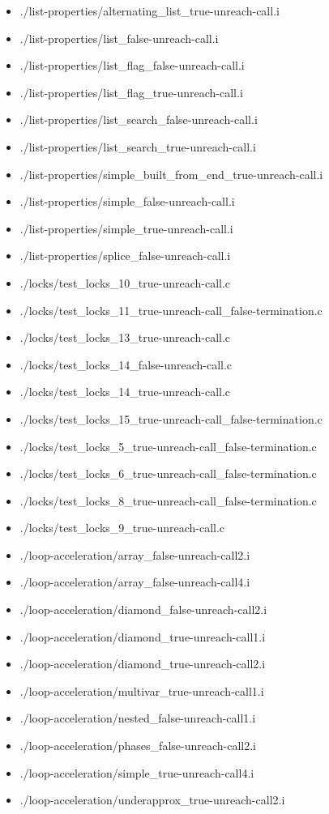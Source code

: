 \documentclass[envcountsame]{llncs}
\begin{document}
\begin{itemize}
\item ./list-properties/alternating\_list\_true-unreach-call.i
\item ./list-properties/list\_false-unreach-call.i
\item ./list-properties/list\_flag\_false-unreach-call.i
\item ./list-properties/list\_flag\_true-unreach-call.i
\item ./list-properties/list\_search\_false-unreach-call.i
\item ./list-properties/list\_search\_true-unreach-call.i
\item ./list-properties/simple\_built\_from\_end\_true-unreach-call.i
\item ./list-properties/simple\_false-unreach-call.i
\item ./list-properties/simple\_true-unreach-call.i
\item ./list-properties/splice\_false-unreach-call.i



\item ./locks/test\_locks\_10\_true-unreach-call.c
\item ./locks/test\_locks\_11\_true-unreach-call\_false-termination.c
\item ./locks/test\_locks\_13\_true-unreach-call.c
\item ./locks/test\_locks\_14\_false-unreach-call.c
\item ./locks/test\_locks\_14\_true-unreach-call.c
\item ./locks/test\_locks\_15\_true-unreach-call\_false-termination.c
\item ./locks/test\_locks\_5\_true-unreach-call\_false-termination.c
\item ./locks/test\_locks\_6\_true-unreach-call\_false-termination.c
\item ./locks/test\_locks\_8\_true-unreach-call\_false-termination.c
\item ./locks/test\_locks\_9\_true-unreach-call.c


\item ./loop-acceleration/array\_false-unreach-call2.i
\item ./loop-acceleration/array\_false-unreach-call4.i
\item ./loop-acceleration/diamond\_false-unreach-call2.i
\item ./loop-acceleration/diamond\_true-unreach-call1.i
\item ./loop-acceleration/diamond\_true-unreach-call2.i
\item ./loop-acceleration/multivar\_true-unreach-call1.i
\item ./loop-acceleration/nested\_false-unreach-call1.i
\item ./loop-acceleration/phases\_false-unreach-call2.i
\item ./loop-acceleration/simple\_true-unreach-call4.i
\item ./loop-acceleration/underapprox\_true-unreach-call2.i



\end{itemize}
\end{document}
